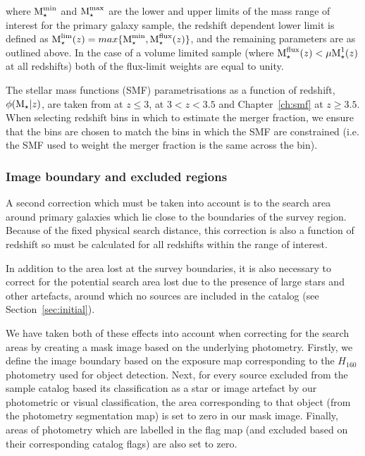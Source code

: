 where $\text{M}_{\star}^{\rm{min}}$ and $\text{M}_{\star}^{\rm{max}}$ are the lower and upper limits of the mass range of interest for the primary galaxy sample, the redshift dependent lower limit is defined as \( \text{M}_{\star}^{\text{lim}}(z) = max \{ \text{M}_{\star}^{\rm{min}}, \text{M}_{\star}^{\rm{flux}}(z) \} \), and the remaining parameters are as outlined above. In the case of a volume limited sample (where \(\text{M}_{\star}^{\rm{flux}}(z) < \mu\text{M}_{\star}^{1}(z) \) at all redshifts) both of the flux-limit weights are equal to unity.

The stellar mass functions (SMF) parametrisations as a function of redshift, \( \phi(\text{M}_{\star}|z) \), are taken from \citet{Mortlock:2014et} at $z \leq 3$, \citet{Santini:2012jq} at $3 < z < 3.5$ and Chapter~\ref{ch:smf} at $z \geq 3.5$. When selecting redshift bins in which to estimate the merger fraction, we ensure that the bins are chosen to match the bins in which the SMF are constrained (i.e. the SMF used to weight the merger fraction is the same across the bin).

\subsubsection{Image boundary and excluded regions}\label{sec:weights_area}
A second correction which must be taken into account is to the search area around primary galaxies which lie close to the boundaries of the survey region. Because of the fixed physical search distance, this correction is also a function of redshift so must be calculated for all redshifts within the range of interest.

In addition to the area lost at the survey boundaries, it is also necessary to correct for the potential search area lost due to the presence of large stars and other artefacts, around which no sources are included in the catalog (see Section~\ref{sec:initial}). 

We have taken both of these effects into account when correcting for the search areas by creating a mask image based on the underlying photometry. Firstly, we define the image boundary based on the exposure map corresponding to the $H_{160}$ photometry used for object detection. Next, for every source excluded from the sample catalog based its classification as a star or image artefact by our photometric or visual classification, the area corresponding to that object (from the photometry segmentation map) is set to zero in our mask image. Finally, areas of photometry which are labelled in the flag map (and excluded based on their corresponding catalog flags) are also set to zero.

